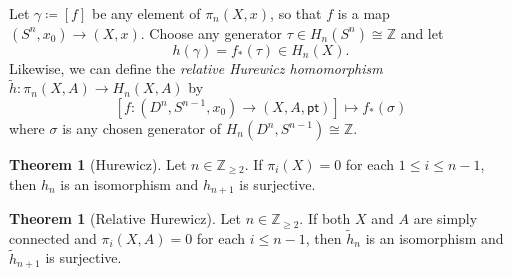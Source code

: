 \documentclass[10pt,letterpaper,cm]{nupset}
\theoremstyle{definition}
\theoremstyle{theorem}
\newtheorem{theorem}[defn]{Theorem}
\theoremstyle{remark}
\newcommand{\Z}{\mathbb Z}
\newcommand{\1}{\mathbb{1}}
\newcommand{\0}{\vec 0}
\newcommand{\pt}{\mathsf{pt}}
\begin{document}
\smallskip

Let $\gamma \coloneqq \left[f\right]$ be any element of $\pi_n(X, x)$, so that $f$ is a map $\left(S^n, x_0\right) \to \left(X, x\right)$. Choose any generator $\tau \in H_n(S^n) \cong \Z$ and let 
\[
h(\gamma) = f_{\ast}(\tau) \in H_n(X).
\]
Likewise, we can define the \textit{relative Hurewicz homomorphism} $\tilde{h} : \pi_n(X, A) \to H_n(X,A)$ by $$\left[f: \left(D^n, S^{n-1}, x_0\right) \to \left(X, A, \pt\right)\right] \mapsto f_{\ast}(\sigma)$$ where $\sigma$ is any chosen generator of $H_n(D^n, S^{n-1}) \cong \Z$. 

\begin{theorem}[Hurewicz]\label{Hur}
Let $n\in \Z_{\geq 2}$. If $\pi_i(X) =0$ for each $1\leq i \leq n-1$, then $h_n$ is an isomorphism and $h_{n+1}$ is surjective.  
\end{theorem}

\begin{theorem}[Relative Hurewicz]\label{relHur}
Let $n\in \Z_{\geq 2}$. If both $X$ and $A$ are simply connected and $\pi_i(X, A) =0$ for each $i\leq n-1$, then $\tilde{h}_n$ is an isomorphism and $\tilde{h}_{n+1}$ is surjective.
\end{theorem}
\end{document}
